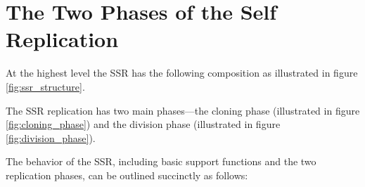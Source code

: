 \section{The Two Phases of the Self Replication}

At the highest level the SSR has the following composition as
illustrated in figure \ref{fig:ssr_structure}.


The SSR replication has two main phases---the cloning phase (illustrated in figure \ref{fig:cloning_phase}) and the division phase (illustrated in figure \ref{fig:division_phase}).



The behavior of the SSR, including basic support functions and the two replication phases, can be outlined succinctly as follows:


